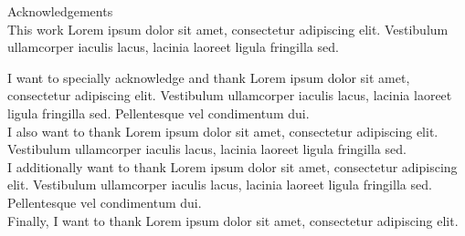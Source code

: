 {\Large \sffamily Acknowledgements}\\

This work Lorem ipsum dolor sit amet, consectetur adipiscing elit. Vestibulum ullamcorper iaculis lacus, lacinia laoreet ligula fringilla sed.

I want to specially acknowledge and thank Lorem ipsum dolor sit amet, consectetur adipiscing elit. Vestibulum ullamcorper iaculis lacus, lacinia laoreet ligula fringilla sed. Pellentesque vel condimentum dui. \\

I also want to thank Lorem ipsum dolor sit amet, consectetur adipiscing elit. Vestibulum ullamcorper iaculis lacus, lacinia laoreet ligula fringilla sed.\\

I additionally want to thank Lorem ipsum dolor sit amet, consectetur adipiscing elit. Vestibulum ullamcorper iaculis lacus, lacinia laoreet ligula fringilla sed. Pellentesque vel condimentum dui. \\

Finally, I want to thank Lorem ipsum dolor sit amet, consectetur adipiscing elit.
